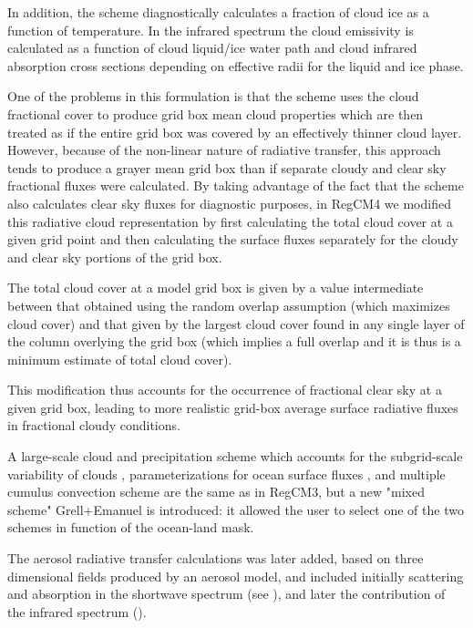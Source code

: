In addition, the scheme diagnostically calculates a fraction of cloud ice as a
function of temperature. In the infrared spectrum the cloud emissivity is
calculated as a function of cloud liquid/ice water path and cloud infrared
absorption cross sections depending on effective radii for the liquid and ice
phase.

One of the problems in this formulation is that the scheme uses the cloud
fractional cover to produce grid box mean cloud properties which are then
treated as if the entire grid box was covered by an effectively thinner
cloud layer. However, because of the non-linear nature of radiative transfer,
this approach tends to produce a grayer mean grid box than if separate
cloudy and clear sky fractional fluxes were calculated. By taking advantage
of the fact that the scheme also calculates clear sky fluxes for diagnostic
purposes, in \ac{RegCM}4 we modified this radiative cloud representation by
first calculating the total cloud cover at a given grid point and then
calculating the surface fluxes separately for the cloudy and clear sky
portions of the grid box.

The total cloud cover at a model grid box is given by a value
intermediate between that obtained using the random overlap assumption
(which maximizes cloud cover) and that given by the largest cloud cover
found in any single layer of the column overlying the grid box (which implies
a full overlap and it is thus is a minimum estimate of total cloud cover).

This modification thus accounts for the occurrence of fractional clear sky at
a given grid box, leading to more realistic grid-box average surface radiative
fluxes in fractional cloudy conditions.

A large-scale cloud and precipitation scheme which accounts for the
subgrid-scale variability of clouds \citep{Pal_00}, parameterizations for
ocean surface fluxes \citep{Zeng_98}, and multiple cumulus convection scheme
\citep{Anthes_77,Grell_93,Emanuel_91,Emanuel_99} are the same as in \ac{RegCM}3,
but a new "mixed scheme" Grell+Emanuel is introduced: it allowed the user to
select one of the two schemes in function of the ocean-land mask.

The aerosol radiative transfer calculations was later added,
based on three dimensional fields produced by an aerosol model, and
included initially scattering and absorption in the shortwave spectrum (see
\cite{Giorgi_02}), and later the contribution of the infrared
spectrum (\cite{Solmon_08}).

